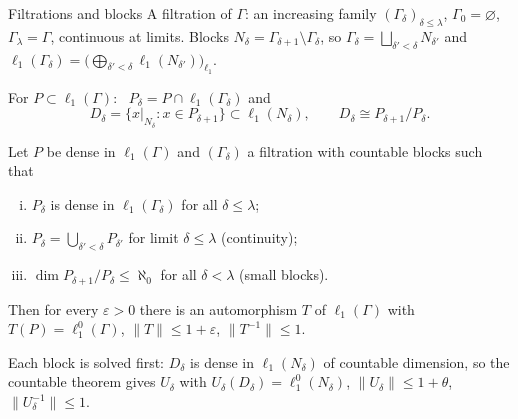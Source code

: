 \documentclass[10pt,aspectratio=169]{beamer}
\newcommand{\lo}[1]{\ell_1^0(#1)}
\newcommand{\ellone}[1]{\ell_1(#1)}
\begin{document}
\begin{frame}{Filtrations and blocks}
  A \alert{filtration} of $\Gamma$: an increasing family ${(\Gamma_\delta)}_{\delta\le\lambda}$,
  $\Gamma_0=\varnothing$, $\Gamma_\lambda=\Gamma$, continuous at limits.
  Blocks $N_\delta=\Gamma_{\delta+1}\setminus\Gamma_\delta$, so
  $\Gamma_\delta=\bigsqcup_{\delta'<\delta}N_{\delta'}$ and
  $\ellone{\Gamma_\delta}=\bigl(\bigoplus_{\delta'<\delta}\ellone{N_{\delta'}}\bigr)_{\ell_1}$.
  \medskip

  For $P\subset\ellone\Gamma$: \ $P_\delta=P\cap\ellone{\Gamma_\delta}$ and
  \[
    D_\delta=\{x|_{N_\delta}:x\in P_{\delta+1}\}\subset\ellone{N_\delta},
    \qquad D_\delta\cong P_{\delta+1}/P_\delta .
  \]
  \begin{theorem}
    Let $P$ be dense in $\ellone\Gamma$ and ${(\Gamma_\delta)}$ a filtration with
    countable blocks such that
    \begin{enumerate}[(i)]
      \item $P_\delta$ is dense in $\ellone{\Gamma_\delta}$ for all $\delta\le\lambda$;
      \item $P_\delta=\bigcup_{\delta'<\delta}P_{\delta'}$ for limit $\delta\le\lambda$ \hfill (continuity);
      \item $\dim P_{\delta+1}/P_\delta\le\aleph_0$ for all $\delta<\lambda$ \hfill (small blocks).
    \end{enumerate}
    Then for every $\varepsilon>0$ there is an automorphism $T$ of $\ellone\Gamma$
    with $T(P)=\lo\Gamma$, $\|T\|\le1+\varepsilon$, $\|T^{-1}\|\le1$.
  \end{theorem}
  Each block is solved first: $D_\delta$ is dense in $\ellone{N_\delta}$ of
  countable dimension, so the countable theorem gives $U_\delta$ with
  $U_\delta(D_\delta)=\lo{N_\delta}$, $\|U_\delta\|\le1+\theta$, $\|U_\delta^{-1}\|\le1$.
\end{frame}
\end{document}
